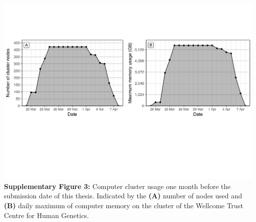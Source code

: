 \documentclass[a4paper,twoside]{dphilthesis}
\begin{document}
\vspace*{2ex}

\begin{flushleft}
\includegraphics[width=\textwidth]{./img/stat_clusterload}
\vspace*{-5ex}
\small\singlespacing\textbf{Supplementary Figure 3:} Computer cluster usage one month before the submission date of this thesis. Indicated by the \textbf{(A)} number of nodes used and \textbf{(B)} daily maximum of computer memory on the cluster of the Wellcome Trust Centre for Human Genetics.
\end{flushleft}



\cleardoublepage
\thispagestyle{empty}



\end{document}
